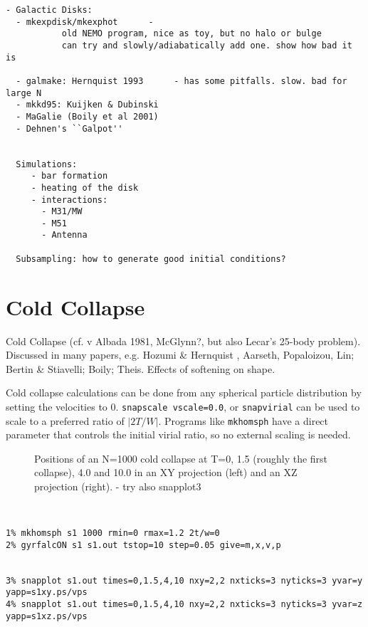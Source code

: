 \footnotesize\begin{verbatim}
- Galactic Disks:
  - mkexpdisk/mkexphot      - 
           old NEMO program, nice as toy, but no halo or bulge
           can try and slowly/adiabatically add one. show how bad it is

  - galmake: Hernquist 1993      - has some pitfalls. slow. bad for large N
  - mkkd95: Kuijken & Dubinski
  - MaGalie (Boily et al 2001) 
  - Dehnen's ``Galpot''


  Simulations:
     - bar formation
     - heating of the disk
     - interactions:
       - M31/MW
       - M51
       - Antenna

  Subsampling: how to generate good initial conditions?

\end{verbatim}\normalsize



\section{Cold Collapse}


Cold Collapse (cf. v Albada 1981, McGlynn?, but also Lecar's 25-body problem).
Discussed in many papers, e.g. Hozumi \& Hernquist ,
Aarseth, Popaloizou, Lin;  Bertin \& Stiavelli; Boily; Theis. Effects
of softening on shape.

Cold collapse calculations can be done from any spherical particle
distribution by setting the velocities to 0. {\tt snapscale vscale=0.0},
or {\tt snapvirial} can be used to scale to a preferred ratio of $|2T/W|$.
Programs like {\tt mkhomsph} have a direct parameter that controls
the initial virial ratio, so no external scaling is needed.



\begin{figure}[htb]
\caption[Cold Collapse of an N=1000 system]
{Positions of an N=1000 cold collapse at T=0, 1.5 (roughly
the first collapse), 4.0 and 10.0 in an XY projection (left) 
and an XZ projection (right). - try also snapplot3 }
\label{f:s1xy}
\end{figure}

\footnotesize\begin{verbatim}


1% mkhomsph s1 1000 rmin=0 rmax=1.2 2t/w=0
2% gyrfalcON s1 s1.out tstop=10 step=0.05 give=m,x,v,p


3% snapplot s1.out times=0,1.5,4,10 nxy=2,2 nxticks=3 nyticks=3 yvar=y yapp=s1xy.ps/vps
4% snapplot s1.out times=0,1.5,4,10 nxy=2,2 nxticks=3 nyticks=3 yvar=z yapp=s1xz.ps/vps

\end{verbatim}\normalsize

